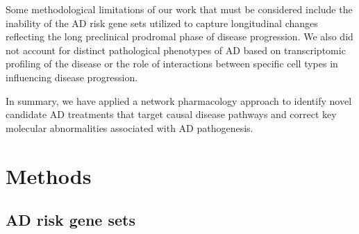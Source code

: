 \documentclass[letterpaper]{article}
\begin{document}

Some methodological limitations of our work that must be considered include
the inability of the AD risk gene sets utilized to capture longitudinal changes
reflecting the long preclinical prodromal phase of disease progression. We
also did not account for distinct pathological phenotypes of AD based on
transcriptomic profiling of the disease or the role of interactions between
specific cell types in influencing disease progression. 

In summary, we have applied a network pharmacology approach to identify novel
candidate AD treatments that target causal disease pathways and correct key
molecular abnormalities associated with AD pathogenesis.


\section{Methods}

\subsection{AD risk gene sets}
\end{document}
